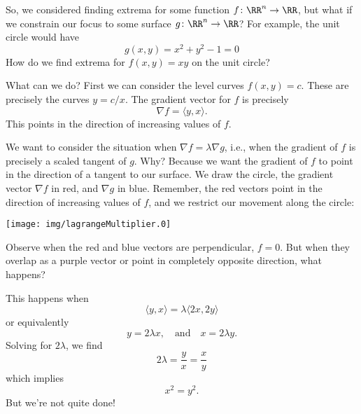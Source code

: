 
\M
So, we considered finding extrema for some function
$f\colon\RR^{n}\to\RR$, but what if we constrain our focus to
some surface $g\colon\RR^{n}\to\RR$? For example, the unit circle
would have
\begin{equation}
g(x,y) = x^{2}+y^{2} - 1=0
\end{equation}
How do we find extrema for $f(x,y)=xy$ on the unit circle?\more

\M What can we do? First we can consider the level curves
$f(x,y)=c$. These are precisely the curves $y=c/x$. The gradient
vector for $f$ is precisely
\begin{equation}
\nabla f=\langle y,x\rangle.
\end{equation}
This points in the direction of increasing values of $f$. 

\M
We want to consider the situation when $\nabla f=\lambda\nabla
g$, i.e., when the gradient of $f$ is precisely a scaled tangent
of $g$. Why? Because we want the gradient of $f$ to point in the
direction of a tangent to our surface. We draw the circle, the
gradient vector $\nabla f$ in red, and $\nabla g$ in
blue. Remember, the red vectors point in the direction of
increasing values of $f$, and we restrict our movement along the circle:
\begin{center}
  \texttt{[image: img/lagrangeMultiplier.0]}
\end{center}
Observe when the red and blue vectors are perpendicular,
$f=0$. But when they overlap as a purple vector or point in
completely opposite direction, what happens?

This happens when
\begin{equation}
\langle y,x\rangle = \lambda\langle 2x,2y\rangle
\end{equation}
or equivalently
\begin{equation}
y=2\lambda x,\quad\mbox{and}\quad
x=2\lambda y.
\end{equation}
Solving for $2\lambda$, we find
\begin{equation}
2\lambda = \frac{y}{x} = \frac{x}{y}
\end{equation}
which implies
\begin{equation}
x^{2}=y^{2}.
\end{equation}
But we're not quite done!

